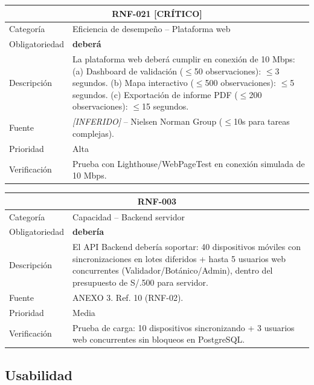 \documentclass[12pt, a4paper]{article}
\newcommand{\criticomark}{\textcolor{criticolor}{\textbf{[CR\'ITICO]}}}
\newcommand{\inferido}{\textcolor{medio}{\textit{[INFERIDO]}}}
\begin{document}
\begin{longtable}{|p{3cm}|p{11.5cm}|}
\hline
\multicolumn{2}{|c|}{\textbf{RNF-021} \criticomark} \\
\hline
Categor\'ia & Eficiencia de desempe\~no -- Plataforma web \\
\hline
Obligatoriedad & \textbf{deber\'a} \\
\hline
Descripci\'on & La plataforma web deber\'a cumplir en conexi\'on de 10 Mbps:\newline
(a) Dashboard de validaci\'on ($\leq$50 observaciones): $\leq$3 segundos.\newline
(b) Mapa interactivo ($\leq$500 observaciones): $\leq$5 segundos.\newline
(c) Exportaci\'on de informe PDF ($\leq$200 observaciones): $\leq$15 segundos. \\
\hline
Fuente & \inferido{} -- Nielsen Norman Group ($\leq$10s para tareas complejas). \\
\hline
Prioridad & Alta \\
\hline
Verificaci\'on & Prueba con Lighthouse/WebPageTest en conexi\'on simulada de 10 Mbps. \\
\hline
\end{longtable}

\begin{longtable}{|p{3cm}|p{11.5cm}|}
\hline
\multicolumn{2}{|c|}{\textbf{RNF-003}} \\
\hline
Categor\'ia & Capacidad -- Backend servidor \\
\hline
Obligatoriedad & \textbf{deber\'ia} \\
\hline
Descripci\'on & El API Backend deber\'ia soportar: 40 dispositivos m\'oviles con sincronizaciones en lotes diferidos + hasta 5 usuarios web concurrentes (Validador/Bot\'anico/Admin), dentro del presupuesto de S/.500 para servidor. \\
\hline
Fuente & ANEXO 3. Ref. 10 (RNF-02). \\
\hline
Prioridad & Media \\
\hline
Verificaci\'on & Prueba de carga: 10 dispositivos sincronizando + 3 usuarios web concurrentes sin bloqueos en PostgreSQL. \\
\hline
\end{longtable}

\subsection{Usabilidad}
\end{document}
